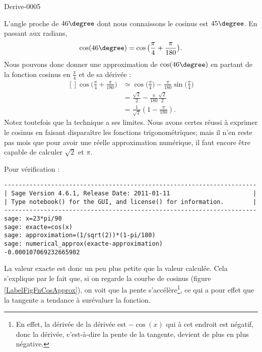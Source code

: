 
\begin{corrige}{Derive-0005}

    L'angle proche de $46\degree$ dont nous connaissons le cosinus est $45\degree$. En passant aux radians,
    \begin{equation}
        \cos(46\degree)=\cos\big( \frac{ \pi }{ 4 }+\frac{ \pi }{ 180 } \big).
    \end{equation}
    Nous pouvons donc donner une approximation de $\cos(46\degree)$ en partant de la fonction cosinus en $\frac{ \pi }{ 4 }$ et de sa dérivée :
    \begin{equation}
        \begin{aligned}[]
            \cos\big( \frac{ \pi }{ 4 }+\frac{ \pi }{ 180 } \big)&\simeq\cos\big( \frac{ \pi }{ 4 } \big)-\frac{ \pi }{ 180 }\sin\big( \frac{ \pi }{ 4 } \big)\\
            &=\frac{ \sqrt{2} }{2}-\frac{ \pi }{ 180 }\frac{ \sqrt{2} }{2}\\
            &=\frac{1}{ \sqrt{2} }\left( 1-\frac{ \pi }{ 180 } \right).
        \end{aligned}
    \end{equation}
    Notez toutefois que la technique a ses limites. Nous avons certes réussi à exprimer le cosinus en faisant disparaître les fonctions trigonométriques; mais il n'en reste pas mois que pour avoir une réelle approximation numérique, il faut encore être capable de calculer $\sqrt{2}$ et $\pi$.

    Pour vérification :
    \begin{verbatim}
----------------------------------------------------------------------
| Sage Version 4.6.1, Release Date: 2011-01-11                       |
| Type notebook() for the GUI, and license() for information.        |
----------------------------------------------------------------------
sage: x=23*pi/90 
sage: exacte=cos(x)
sage: approximation=(1/sqrt(2))*(1-pi/180)
sage: numerical_approx(exacte-approximation)
-0.000107069232665902
    \end{verbatim}
    La valeur exacte est donc un peu plus petite que la valeur calculée. Cela s'explique par le fait que, si on regarde la courbe de cosinus (figure \ref{LabelFigFnCosApprox}), on voit que la pente s'accélère\footnote{En effet, la dérivée de la dérivée est $-\cos(x)$ qui à cet endroit est négatif, donc la dérivée, c'est-à-dire la pente de la tangente, devient de plus en plus négative.}, ce qui a pour effet que la tangente a tendance à surévaluer la fonction.

    \newcommand{\CaptionFigFnCosApprox}{La fonction cosinus autour de $\frac{ \pi }{2}$.}
    

\end{corrige}
